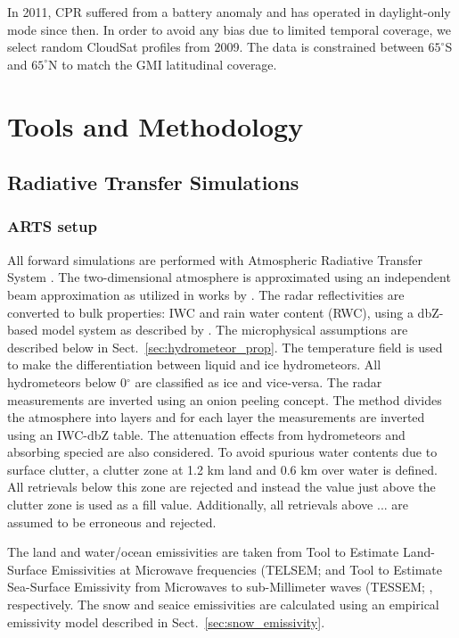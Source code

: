 \documentclass[amt, manuscript]{copernicus}
\newcommand{\todo}[1]{{\color{red} #1}}
\begin{document}
In 2011, CPR suffered from a battery anomaly and has operated in daylight-only mode since then. In order to avoid any bias due to limited temporal coverage, we select random CloudSat profiles from 2009. The data is constrained between $65^{\circ}$S and $65^{\circ}$N to match the GMI latitudinal coverage. 


\section{Tools and Methodology}

\subsection{Radiative Transfer Simulations}
\label{sec:rt_simulations}

\subsubsection{ARTS setup}
\label{sec:arts_setup}
All forward simulations are performed with Atmospheric Radiative Transfer System \citep{eriksson:arts2:11}. The two-dimensional atmosphere is approximated using an independent beam approximation as utilized in works by \citet{ekelund2020using, eriksson:towar:20}. 
The radar reflectivities are converted to bulk properties: IWC and rain water content (RWC), using a dbZ-based model system as described by \citet{ekelund2020using}. The microphysical assumptions are described below in Sect.~\ref{sec:hydrometeor_prop}. The temperature field is used to make the differentiation between liquid and ice hydrometeors. All hydrometeors below 0$^{\circ}$ are classified as ice and vice-versa. The radar measurements are inverted using an onion peeling concept. The method  divides the atmosphere into layers and for each layer the measurements are inverted using an IWC-dbZ table. The attenuation effects from hydrometeors and absorbing specied are also considered. To avoid spurious water contents due to surface clutter, a clutter zone at 1.2\,\,km land and 0.6\,\,km over water is defined. All retrievals below this zone are rejected and instead the value just above the clutter zone is used as a fill value. Additionally, all retrievals above \todo{...} are assumed to be erroneous and rejected.   

The land and water/ocean emissivities are taken from Tool to Estimate Land-Surface Emissivities at Microwave frequencies (TELSEM; \citep{aires2011tool} and  Tool to Estimate Sea-Surface Emissivity from Microwaves to sub-Millimeter waves (TESSEM;
\citep{prigent2017sea}, respectively. The snow and seaice emissivities are calculated using an empirical emissivity model described in Sect.~\ref{sec:snow_emissivity}.
\end{document}
